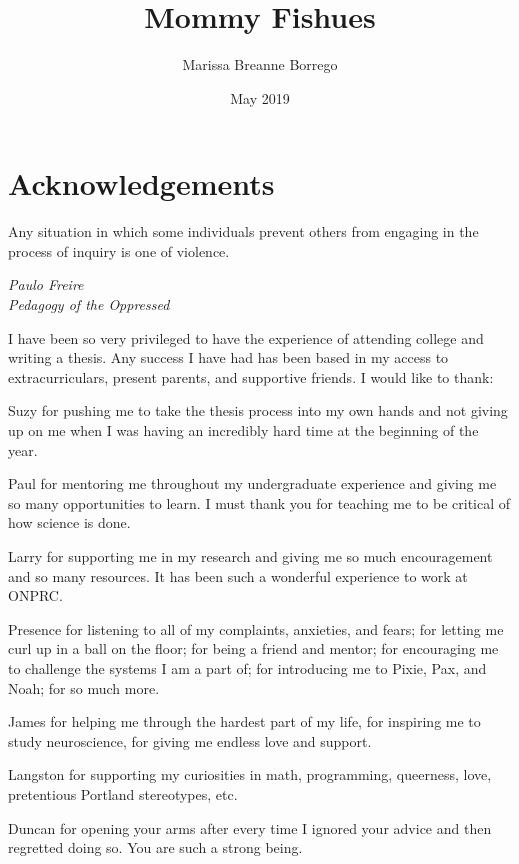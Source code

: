 \documentclass[12pt,twoside]{reedthesis}
\title{Mommy Fishues}
\author{Marissa Breanne Borrego}
\date{May 2019}
\begin{document}
  \maketitle
  \frontmatter %
  \pagestyle{empty} %

    \chapter*{Acknowledgements}
	\epigraph{Any situation in which some individuals prevent others from engaging in the process of inquiry is one of violence.}{\textit{Paulo Freire \\ Pedagogy of the Oppressed}}
	
	I have been so very privileged to have the experience of attending college and writing a thesis. Any success I have had has been based in my access to extracurriculars, present parents, and supportive friends. I would like to thank:
	
	Suzy for pushing me to take the thesis process into my own hands and not giving up on me when I was having an incredibly hard time at the beginning of the year.
	
	Paul for mentoring me throughout my undergraduate experience and giving me so many opportunities to learn. I must thank you for teaching me to be critical of how science is done.
	
	Larry for supporting me in my research and giving me so much encouragement and so many resources. It has been such a wonderful experience to work at ONPRC.
	
	Presence for listening to all of my complaints, anxieties, and fears; for letting me curl up in a ball on the floor; for being a friend and mentor; for encouraging me to challenge the systems I am a part of; for introducing me to Pixie, Pax, and Noah; for so much more.
	
	James for helping me through the hardest part of my life, for inspiring me to study neuroscience, for giving me endless love and support.
	
	Langston for supporting my curiosities in math, programming, queerness, love, pretentious Portland stereotypes, etc.
	
	Duncan for opening your arms after every time I ignored your advice and then regretted doing so. You are such a strong being.
	
\end{document}

